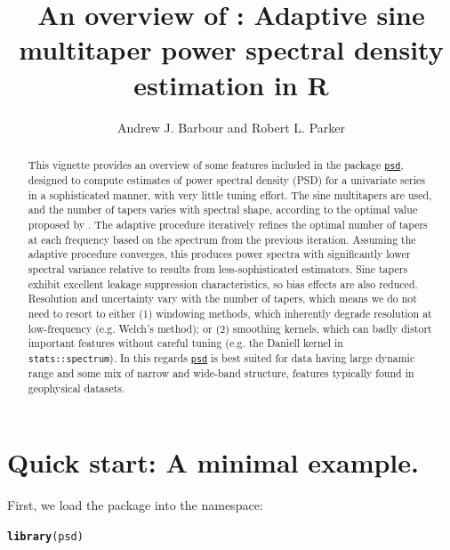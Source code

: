 \documentclass[10pt]{article}\usepackage{graphicx, color}
\author{Andrew J. Barbour and Robert L. Parker}
\title{An overview of \psd{}: Adaptive sine multitaper power spectral density estimation in R}
\makeatletter
\newcommand{\hlfunctioncall}[1]{\textcolor[rgb]{0.501960784313725,0,0.329411764705882}{\textbf{#1}}}%
\newenvironment{kframe}{%
 \def\at@end@of@kframe{}%
 \ifinner\ifhmode%
  \def\at@end@of@kframe{\end{minipage}}%
  \begin{minipage}{\columnwidth}%
 \fi\fi%
 \def\FrameCommand##1{\hskip\@totalleftmargin \hskip-\fboxsep
 \colorbox{shadecolor}{##1}\hskip-\fboxsep
     \hskip-\linewidth \hskip-\@totalleftmargin \hskip\columnwidth}%
 \MakeFramed {\advance\hsize-\width
   \@totalleftmargin\z@ \linewidth\hsize
   \@setminipage}}%
 {\par\unskip\endMakeFramed%
 \at@end@of@kframe}
\newenvironment{knitrout}{}{} %
\newcommand{\Rcmd}[1]{\texttt{#1}}
\newcommand{\psd}[0]{\href{http://abarbour.github.com/psd/}{\color{blue}\Rcmd{psd}}}
\makeatother
\begin{document}
\maketitle
\begin{abstract}
  This vignette provides an overview of some 
  features included in the package \psd{}, designed to
  compute estimates of power spectral
  density (PSD) for a univariate series in a sophisticated manner,
  with very little tuning effort.
  The sine multitapers are used, and
  the number of tapers varies with spectral shape, according
  to the optimal value proposed by \citet{rs1995}.
  The adaptive procedure
  iteratively refines the optimal number of tapers at each frequency
  based on the spectrum from the previous iteration.
  Assuming the adaptive procedure converges, 
  this produces power spectra
  with significantly
  lower spectral variance 
  relative to results from less-sophisticated estimators.
  Sine tapers exhibit excellent
  leakage suppression characteristics, so bias effects
  are also reduced.
  Resolution and uncertainty vary with the number of tapers,
  which means we do
  not need to resort to either (1) windowing methods,
  which inherently degrade resolution at low-frequency
  (e.g. Welch's method); or (2) smoothing kernels,
  which can badly distort important features without careful tuning
  (e.g. the Daniell kernel in \Rcmd{stats::spectrum}).
  In this regards
  \psd{} is best suited for data having 
   large dynamic range and some mix of narrow and wide-band structure,
   features typically found in geophysical datasets.
\end{abstract}

\tableofcontents
\pagebreak

\section{Quick start: A minimal example.}
First, we load the package into the namespace:


\begin{knitrout}
\color{fgcolor}\begin{kframe}
\begin{alltt}
\hlfunctioncall{library}(psd)
\end{alltt}


{\ttfamily\noindent\itshape\color{messagecolor}{\#\# Loading required package: fftw}}

{\ttfamily\noindent\itshape\color{messagecolor}{\#\# Loaded psd (0.3.2) -- Adaptive multitaper spectrum estimation.}}\end{kframe}
\end{knitrout}
\end{document}
